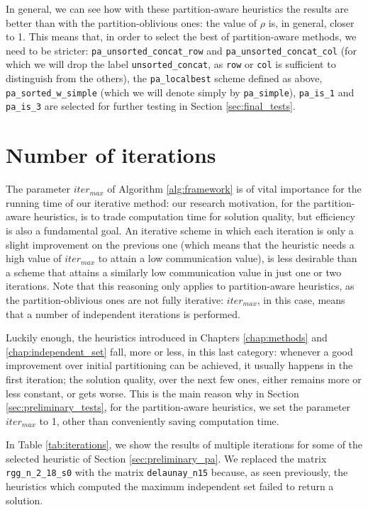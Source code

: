 In general, we can see how with these partition-aware heuristics the results are better than with the partition-oblivious ones: the value of $\rho$ is, in general, closer to 1. This means that, in order to select the best of partition-aware methods, we need to be stricter: \verb|pa_unsorted_concat_row| and \verb|pa_unsorted_concat_col| (for which we will drop the label \verb|unsorted_concat|, as \verb|row| or \verb|col| is sufficient to distinguish from the others), the \verb|pa_localbest| scheme defined as above, \verb|pa_sorted_w_simple| (which we will denote simply by \verb|pa_simple|), \verb|pa_is_1| and \verb|pa_is_3| are selected for further testing in Section \ref{sec:final_tests}.

\section{Number of iterations} \label{sec:iter_max}

The parameter $iter_{max}$ of Algorithm \ref{alg:framework} is of vital importance for the running time of our iterative method: our research motivation, for the partition-aware heuristics, is to trade computation time for solution quality, but efficiency is also a fundamental goal. An iterative scheme in which each iteration is only a slight improvement on the previous one (which means that the heuristic needs a high value of $iter_{max}$ to attain a low communication value), is less desirable than a scheme that attains a similarly low communication value in just one or two iterations. Note that this reasoning only applies to partition-aware heuristics, as the partition-oblivious ones are not fully iterative: $iter_{max}$, in this case, means that a number of independent iterations is performed.

Luckily enough, the heuristics introduced in Chapters \ref{chap:methods} and \ref{chap:independent_set} fall, more or less, in this last category: whenever a good improvement over initial partitioning can be achieved, it usually happens in the first iteration; the solution quality, over the next few ones, either remains more or less constant, or gets worse. This is the main reason why in Section \ref{sec:preliminary_tests}, for the partition-aware heuristics, we set the parameter $iter_{max}$ to 1, other than conveniently saving computation time.

In Table \ref{tab:iterations}, we show the results of multiple iterations for some of the selected heuristic of Section \ref{sec:preliminary_pa}. We replaced the matrix \verb|rgg_n_2_18_s0| with the matrix \verb|delaunay_n15| because, as seen previously, the heuristics which computed the maximum independent set failed to return a solution.


